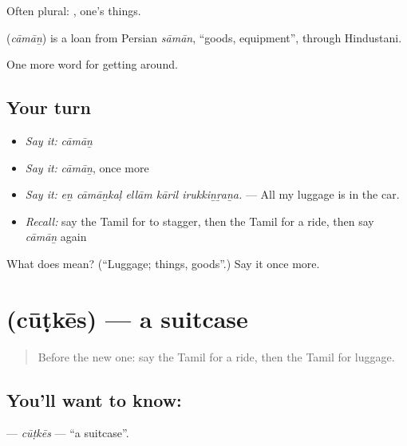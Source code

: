 Often plural: , one's things.

\begin{cousinweb}
\textbf{} (\emph{cāmāṉ}) is a loan from Persian \emph{sāmān}, \textquotedblleft{}goods, equipment\textquotedblright{}, through Hindustani.
\end{cousinweb}

\begin{grammarlens}[title={What you've built}]
One more word for getting around.
\end{grammarlens}

\subsection*{Your turn}
\begin{itemize}
\raggedright
  \item \emph{Say it:} \emph{cāmāṉ}
  \item \emph{Say it:} \emph{cāmāṉ}, once more
  \item \emph{Say it:} \emph{eṉ cāmāṉkaḷ ellām kāril irukkiṉṟaṉa.} — All my luggage is in the car.
  \item \emph{Recall:} say the Tamil for to stagger, then the Tamil for a ride, then say \emph{cāmāṉ} again
\end{itemize}

\begin{tcolorbox}[breakable,colback=teal!4,colframe=teal!35!black,title={Before you move on}]
What does  mean? (\textquotedblleft{}Luggage; things, goods\textquotedblright{}.) Say it once more.
\end{tcolorbox}
\section[\texorpdfstring{\ta{சூட்கேஸ்} (cūṭkēs)}{சூட்கேஸ் (cūṭkēs)}]{ (cūṭkēs) — a suitcase}

\label{lesson:TA-C402-cutkes}



\begin{quote}
Before the new one: say the Tamil for a ride, then the Tamil for luggage.
\end{quote}

\subsection*{You'll want to know: }
\textbf{} — \emph{cūṭkēs} — \textquotedblleft{}a suitcase\textquotedblright{}.

